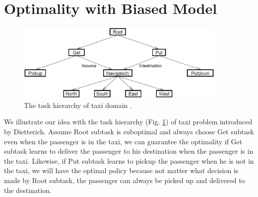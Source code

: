 \documentclass{article} %
\begin{document}


\section{Optimality with Biased Model}
\begin{figure}[t]
\begin{center}
    \includegraphics[width=4in] {TaxiHierarchy.eps}
\end{center}
\caption{The task hierarchy of taxi domain \cite{MaxQJ}.}
\label{fig:taxi}
\end{figure}


We illustrate our idea with the task hierarchy (Fig. \ref{fig:taxi}) of taxi problem introduced by Dietterich\cite{MaxQJ}.
Assume Root subtask is suboptimal and always choose Get subtask even when 
the passenger is in the taxi, we can guarantee the optimality if Get subtask
learns to deliver the passenger to his destination when the passenger is in the taxi.
Likewise, if Put subtask learns to pickup the passenger when he is not in the taxi, 
we will have the optimal policy because not matter what decision is made 
by Root subtask, the passenger can always be picked up and delivered to the destination.
\end{document}
